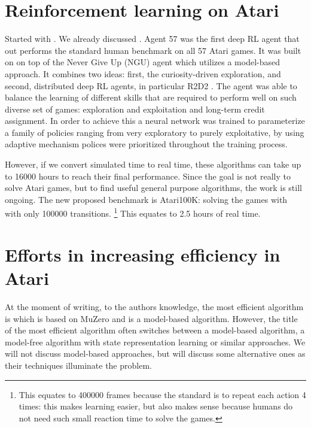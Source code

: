 \section{Reinforcement learning on Atari}
Started with \cite{mnih2013atari}. We already discussed \cite{rainbow}.
Agent 57 \cite{agent57}  was the first deep RL agent that out performs 
the standard human benchmark on all 57 Atari games.
It was built on  on top of the Never Give Up (NGU) \cite{badia2020never} agent which utilizes a model-based approach.
It combines two ideas: first, 
the curiosity-driven exploration, and second, 
distributed deep RL agents, in particular R2D2 \cite{kapturowski2018recurrent}.
The agent was able to balance the learning of different 
skills that are required to perform well on such diverse set of games: 
exploration and exploitation and long-term credit assignment.
In order to achieve this a neural network was trained to parameterize 
a family of policies ranging from very exploratory to purely exploitative,
by using adaptive  mechanism polices were prioritized throughout the training process.


However, if we convert simulated time to real time,
these algorithms can take up to 16000 hours to reach their final performance.
Since the goal is not really to solve Atari games, but to find useful general purpose
algorithms, the work is still ongoing.
The new proposed benchmark is Atari100K: solving the games with with only 100000 transitions.
\footnote{This equates to 400000 frames because the standard is to repeat each action 4 times:
		this makes learning easier, but also makes sense because humans do not need
such small reaction time to solve the games.}
This equates to 2.5 hours of real time.

\section{Efforts in increasing efficiency in Atari}
At the moment of writing, to the authors knowledge, the most efficient 
algorithm is \cite{ye2021mastering} which is based on MuZero \cite{schrittwieser2020mastering}
and is a model-based algorithm.
However, the title of the most efficient algorithm often switches
between a model-based algorithm, a model-free algorithm with state representation learning
or similar approaches.
We will not discuss model-based approaches, but will discuss some alternative ones
as their techniques illuminate the problem.

